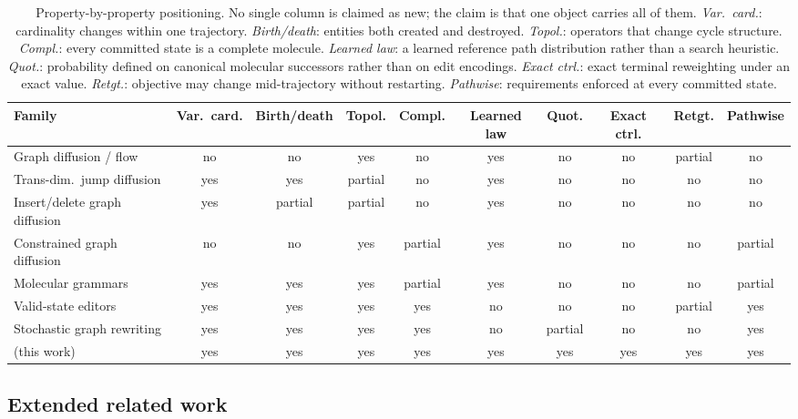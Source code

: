 \begin{table}[h]
\centering
\scriptsize
\setlength{\tabcolsep}{3pt}
\caption{Property-by-property positioning. No single column is claimed as new; the claim is that one object carries all of them. \emph{Var.\ card.}: cardinality changes within one trajectory. \emph{Birth/death}: entities both created and destroyed. \emph{Topol.}: operators that change cycle structure. \emph{Compl.}: every committed state is a complete molecule. \emph{Learned law}: a learned reference path distribution rather than a search heuristic. \emph{Quot.}: probability defined on canonical molecular successors rather than on edit encodings. \emph{Exact ctrl.}: exact terminal reweighting under an exact value. \emph{Retgt.}: objective may change mid-trajectory without restarting. \emph{Pathwise}: requirements enforced at every committed state.}
\label{tab:positioning}
\begin{tabular*}{\textwidth}{@{\extracolsep{\fill}}lccccccccc}
\toprule
Family & Var.\ card. & Birth/death & Topol. & Compl. & Learned law & Quot. & Exact ctrl. & Retgt. & Pathwise\\
\midrule
Graph diffusion / flow        & no  & no  & yes & no      & yes & no      & no  & partial & no\\
Trans-dim.\ jump diffusion    & yes & yes & partial & no  & yes & no      & no  & no      & no\\
Insert/delete graph diffusion & yes & partial & partial & no & yes & no  & no  & no      & no\\
Constrained graph diffusion   & no  & no  & yes & partial & yes & no      & no  & no      & partial\\
Molecular grammars            & yes & yes & yes & partial & yes & no      & no  & no      & partial\\
Valid-state editors           & yes & yes & yes & yes     & no  & no      & no  & partial & yes\\
Stochastic graph rewriting    & yes & yes & yes & yes     & no  & partial & no  & no      & yes\\
\midrule
\method{} (this work)         & yes & yes & yes & yes     & yes & yes     & yes & yes     & yes\\
\bottomrule
\end{tabular*}
\end{table}

\subsection{Extended related work}
\label{app:related}

